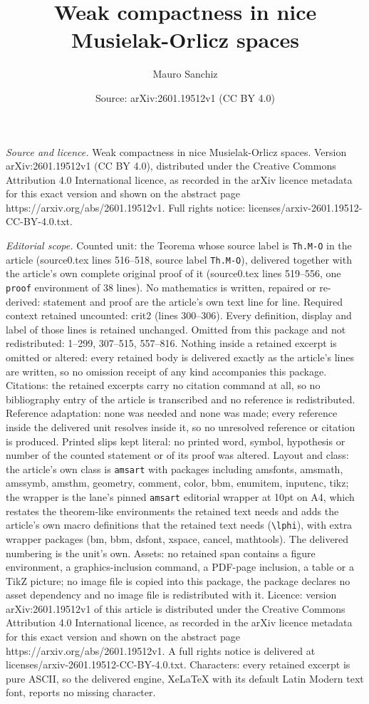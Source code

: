 \documentclass[10pt,a4paper]{amsart}
\title[Weak compactness in nice Musielak-Orlicz spaces]{Weak compactness in nice Musielak-Orlicz spaces}
\author{Mauro Sanchiz}
\date{Source: arXiv:2601.19512v1 (CC BY 4.0)}
\begin{document}
\maketitle

\noindent\emph{Source and licence.} Weak compactness in nice Musielak-Orlicz spaces. Version arXiv:2601.19512v1 (CC BY 4.0), distributed under the Creative Commons Attribution 4.0 International licence, as recorded in the arXiv licence metadata for this exact version and shown on the abstract page https://arxiv.org/abs/2601.19512v1. Full rights notice: licenses/arxiv-2601.19512-CC-BY-4.0.txt.\par\smallskip

\noindent\textit{Editorial scope.} Counted unit: the Teorema whose source label is \texttt{Th.M-O} in the article (source0.tex lines 516--518, source label \texttt{Th.M-O}), delivered together with the article's own complete original proof of it (source0.tex lines 519--556, one \texttt{proof} environment of 38 lines). No mathematics is written, repaired or re-derived: statement and proof are the article's own text line for line. Required context retained uncounted: crit2 (lines 300--306). Every definition, display and label of those lines is retained unchanged. Omitted from this package and not redistributed: 1--299, 307--515, 557--816. Nothing inside a retained excerpt is omitted or altered: every retained body is delivered exactly as the article's lines are written, so no omission receipt of any kind accompanies this package. Citations: the retained excerpts carry no citation command at all, so no bibliography entry of the article is transcribed and no reference is redistributed. Reference adaptation: none was needed and none was made; every reference inside the delivered unit resolves inside it, so no unresolved reference or citation is produced. Printed slips kept literal: no printed word, symbol, hypothesis or number of the counted statement or of its proof was altered. Layout and class: the article's own class is \texttt{amsart} with packages including amsfonts, amsmath, amssymb, amsthm, geometry, comment, color, bbm, enumitem, inputenc, tikz; the wrapper is the lane's pinned \texttt{amsart} editorial wrapper at 10pt on A4, which restates the theorem-like environments the retained text needs and adds the article's own macro definitions that the retained text needs (\texttt{\textbackslash lphi}), with extra wrapper packages (bm, bbm, dsfont, xspace, cancel, mathtools). The delivered numbering is the unit's own. Assets: no retained span contains a figure environment, a graphics-inclusion command, a PDF-page inclusion, a table or a TikZ picture; no image file is copied into this package, the package declares no asset dependency and no image file is redistributed with it. Licence: version arXiv:2601.19512v1 of this article is distributed under the Creative Commons Attribution 4.0 International licence, as recorded in the arXiv licence metadata for this exact version and shown on the abstract page https://arxiv.org/abs/2601.19512v1. A full rights notice is delivered at licenses/arxiv-2601.19512-CC-BY-4.0.txt. Characters: every retained excerpt is pure ASCII, so the delivered engine, XeLaTeX with its default Latin Modern text font, reports no missing character.
\end{document}
